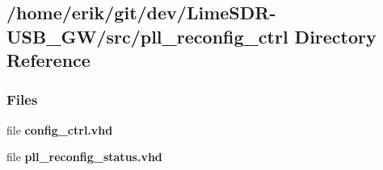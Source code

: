 \subsection{/home/erik/git/dev/\+Lime\+S\+D\+R-\/\+U\+S\+B\+\_\+\+G\+W/src/pll\+\_\+reconfig\+\_\+ctrl Directory Reference}
\label{dir_7c608db87735150e278988c3a42ee7c5}
\subsubsection*{Files}
\begin{DoxyCompactItemize}
\item 
file {\bf config\+\_\+ctrl.\+vhd}
\item 
file {\bf pll\+\_\+reconfig\+\_\+status.\+vhd}
\end{DoxyCompactItemize}
